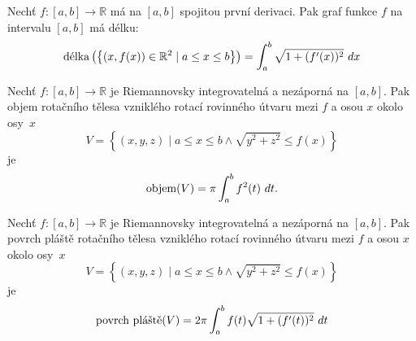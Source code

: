 \begin{theorem}
	Nechť $f \colon [a, b] \rightarrow \mathbb{R}$ má na $[a, b]$ spojitou první derivaci.
	Pak graf funkce $f$ na intervalu $[a, b]$ má délku:
	$$\text{délka}\left( \left\{ (x, f(x)) \in \mathbb{R}^2 \mid a \leq x \leq b \right\} \right) = \int_{a}^{b} \sqrt{1 + (f'(x))^2} \ dx$$
	\label{thm:delka_krivky}
\end{theorem}

\begin{theorem}
	Nechť $f \colon [a, b] \rightarrow \mathbb{R}$ je Riemannovsky integrovatelná a nezáporná na $[a, b]$.
	Pak objem rotačního tělesa vzniklého rotací rovinného útvaru mezi $f$ a osou $x$ okolo osy~$x$
	$$V = \left\{ \left( x, y, z \right) \mid a \leq x \leq b \wedge \sqrt{y^2 + z^2} \leq f(x) \right\}$$
	je
	$$\text{objem}(V) = \pi \int_{a}^{b} f^{2}(t) \ dt.$$
	\label{thm:objem_rotacniho_telesa}
\end{theorem}

\begin{theorem}
	Nechť $f \colon [a, b] \rightarrow \mathbb{R}$ je Riemannovsky integrovatelná a nezáporná na $[a, b]$.
	Pak povrch pláště rotačního tělesa vzniklého rotací rovinného útvaru mezi $f$ a osou $x$ okolo osy~$x$
	$$V = \left\{ \left( x, y, z \right) \mid a \leq x \leq b \wedge \sqrt{y^2 + z^2} \leq f(x) \right\}$$
	je
	$$\text{povrch pláště}(V) = 2 \pi \int_{a}^{b} f(t) \sqrt{1 + (f'(t))^2} \ dt$$
	\label{thm:povrch_rotacniho_telesa}
\end{theorem}

